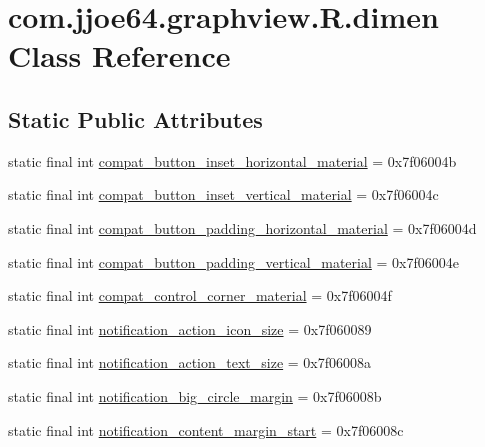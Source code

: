 \hypertarget{classcom_1_1jjoe64_1_1graphview_1_1_r_1_1dimen}{}\section{com.\+jjoe64.\+graphview.\+R.\+dimen Class Reference}
\label{classcom_1_1jjoe64_1_1graphview_1_1_r_1_1dimen}
\subsection*{Static Public Attributes}
\begin{DoxyCompactItemize}
\item 
static final int \mbox{\hyperlink{classcom_1_1jjoe64_1_1graphview_1_1_r_1_1dimen_aeef2b2cd077ae20951c1c2dec2b2e79f}{compat\+\_\+button\+\_\+inset\+\_\+horizontal\+\_\+material}} = 0x7f06004b
\item 
static final int \mbox{\hyperlink{classcom_1_1jjoe64_1_1graphview_1_1_r_1_1dimen_afb16257eae9519143aed38fe4cc3a295}{compat\+\_\+button\+\_\+inset\+\_\+vertical\+\_\+material}} = 0x7f06004c
\item 
static final int \mbox{\hyperlink{classcom_1_1jjoe64_1_1graphview_1_1_r_1_1dimen_a97bd9889bda63f389be355be4eebb04c}{compat\+\_\+button\+\_\+padding\+\_\+horizontal\+\_\+material}} = 0x7f06004d
\item 
static final int \mbox{\hyperlink{classcom_1_1jjoe64_1_1graphview_1_1_r_1_1dimen_a6069c9f2fe255bcc305dee9a1bc7d6cb}{compat\+\_\+button\+\_\+padding\+\_\+vertical\+\_\+material}} = 0x7f06004e
\item 
static final int \mbox{\hyperlink{classcom_1_1jjoe64_1_1graphview_1_1_r_1_1dimen_a85dcac590055f02d2fd12ef49fa8f843}{compat\+\_\+control\+\_\+corner\+\_\+material}} = 0x7f06004f
\item 
static final int \mbox{\hyperlink{classcom_1_1jjoe64_1_1graphview_1_1_r_1_1dimen_a8eff7cccd53b8808a6613878145f51f6}{notification\+\_\+action\+\_\+icon\+\_\+size}} = 0x7f060089
\item 
static final int \mbox{\hyperlink{classcom_1_1jjoe64_1_1graphview_1_1_r_1_1dimen_a7367e692a1b18030c813e4e9b33068d6}{notification\+\_\+action\+\_\+text\+\_\+size}} = 0x7f06008a
\item 
static final int \mbox{\hyperlink{classcom_1_1jjoe64_1_1graphview_1_1_r_1_1dimen_aa83bb908630170626fb9f64933743231}{notification\+\_\+big\+\_\+circle\+\_\+margin}} = 0x7f06008b
\item 
static final int \mbox{\hyperlink{classcom_1_1jjoe64_1_1graphview_1_1_r_1_1dimen_a0bb01d6fd141cab90c5040ab6575d6fe}{notification\+\_\+content\+\_\+margin\+\_\+start}} = 0x7f06008c

\end{DoxyCompactItemize}
